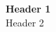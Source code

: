 \documentclass{article}
\begin{document}
\thispagestyle{empty}

\begin{center}
    \vspace*{5cm}
    \huge \textbf{Header 1} \\
    \LARGE Header 2
\end{center}

\clearpage
\end{document}

